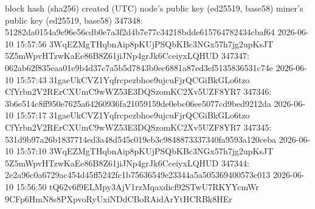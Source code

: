 \begin{shellbox}\begin{ttlst}
                              block hash (sha256)                            created (UTC)         node's public key (ed25519, base58)           miner's public key (ed25519, base58)    
347348: 51282da0154a9e96e56cdb0e7a3f2d4b7e77c34218bdde615764782434cbaf64  2026-06-10 15:57:56  3WqEZMgTHqbnAip8pKUjPSQbKBc3NGx57h7jg2upKsJT  5Z5mWpvHTzwKaEe86B8Z61jiJNp4grJk6CceiyxLQHUD
347347: 062ab62f835eaa01e9b4d37c7a5b5d7843b0ec6881a87ed3ef5135836531c74e  2026-06-10 15:57:43  31gaeUkCVZ1Yqfrcpezbhoe9ujcuFjrQCGiBkGLo6tzo  CfYrbn2V2RErCXUmC9wWZ53E3DQSzomKC2Xv5UZF8YR7
347346: 3b6e514c8ff950e7625a64260936fa21059159de0ebc06ee5077cd9bed9212da  2026-06-10 15:57:17  31gaeUkCVZ1Yqfrcpezbhoe9ujcuFjrQCGiBkGLo6tzo  CfYrbn2V2RErCXUmC9wWZ53E3DQSzomKC2Xv5UZF8YR7
347345: 531d9b97a26b1837714ed3a48d545c019eb3c9848873337340fa9593a120ceba  2026-06-10 15:57:10  3WqEZMgTHqbnAip8pKUjPSQbKBc3NGx57h7jg2upKsJT  5Z5mWpvHTzwKaEe86B8Z61jiJNp4grJk6CceiyxLQHUD
347344: 2e2a96c0a6729ac454d45ff5242fc1b75636549e23344a5a505369400573c013  2026-06-10 15:56:50  tQ62v6f9ELMpy3AjV1rzMqaxdicf92STwU7RKYYcmWr   9CFp6HmN8s8PXpvoRyUxiNDdCBoRAidArYtHCRBk8HEr
\end{ttlst}\end{shellbox}
